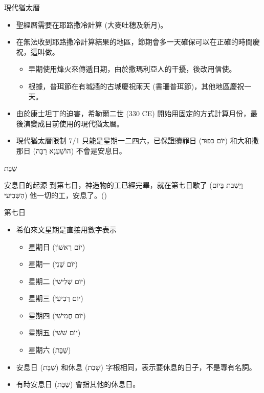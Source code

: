 \documentclass{beamer}
\newcommand{\topic}[1]{
  \begin{frame}
    \centering
    \vspace*{1cm}
    {\fontsize{40}{48}\selectfont #1\par}
    \vfill
  \end{frame}
}
\newcommand{\parvspace}{\par\vspace{0.5em}}
\begin{document}
\begin{frame}{現代猶太曆}
  \begin{itemize}
    \item 聖經曆需要在耶路撒冷計算 (大麥吐穗及新月)。
    \item 在無法收到耶路撒冷計算結果的地區，節期會多一天確保可以在正確的時間慶祝，這叫做\textcite{YomTovSheni}。
      \begin{itemize}
        \item 早期使用烽火來傳遞日期，由於撒瑪利亞人的干擾，後改用信使。\parencite{HistoryOfCalendar}
        \item 根據，普珥節在有城牆的古城慶祝兩天 (書珊普珥節)，其他地區慶祝一天。
      \end{itemize}
    \item 由於康士坦丁的迫害，希勒爾二世 (330 CE) 開始用固定的方式計算月份，最後演變成目前使用的現代猶太曆。\parencite{HistoryOfCalendar}
    \item 現代猶太曆限制 7/1 只能是星期一二四六，已保證贖罪日 (\texthebrew{יוֹם כִּפּוּר}) 和大和撒那日 (\texthebrew{הוֹשַׁעְנָא רַבָּה}) 不會是安息日。\parencite{JewishCalendar}
  \end{itemize}
\end{frame}

\topic{\texthebrew{שַׁבָּת}}

\begin{frame}{安息日的起源}
  到第七日，神造物的工已經完畢，就在\alert{第七日歇了 (\texthebrew{וַיִּשְׁבֹּת בַּיּוֹם
  הַשְּׁבִיעִי})} 他一切的工，安息了。()\parvspace
\end{frame}

\begin{frame}{第七日}
  \begin{itemize}
    \item 希伯來文星期是直接用數字表示
      \begin{itemize}
        \item 星期日 (\texthebrew{יוֹם רִאשׁוֹן})
        \item 星期一 (\texthebrew{יוֹם שֵׁנִי})
        \item 星期二 (\texthebrew{יוֹם שְׁלִישִׁי})
        \item 星期三 (\texthebrew{יוֹם רְבִיעִי})
        \item 星期四 (\texthebrew{יוֹם חֲמִישִׁי})
        \item 星期五 (\texthebrew{יוֹם שִׁשִּׁי})
        \item 星期六 (\texthebrew{שַׁבָּת})
      \end{itemize}
    \item 安息日 (\texthebrew{שַׁבָּת}) 和休息 (\texthebrew{שָׁבַת})
      字根相同，表示要休息的日子，不是專有名詞。
    \item 有時安息日 (\texthebrew{שַׁבָּת}) 會指其他的休息日。
  \end{itemize}
\end{frame}
\end{document}
